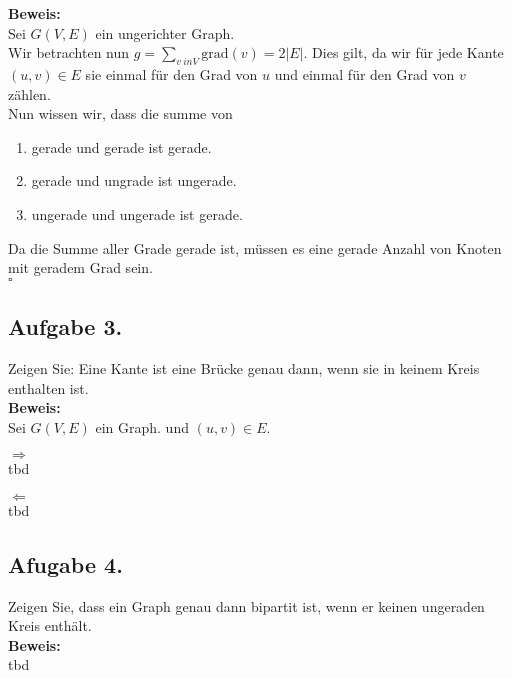\documentclass[11pt,a4paper,ngerman]{article}
\begin{document}
\textbf{Beweis:}\\

Sei $G(V,E)$ ein ungerichter Graph.\\

Wir betrachten nun $g = \underset{v\ in V}{\sum} \text{grad}(v) = 2 |E|$.
Dies gilt, da wir für jede Kante $(u,v) \in E$ sie einmal für den Grad von $u$ und einmal
für den Grad von $v$ zählen.\\

Nun wissen wir, dass die summe von
\begin{enumerate}
	\item gerade und gerade ist gerade.
	\item gerade und ungrade ist ungerade.
	\item ungerade und ungerade ist gerade.
\end{enumerate}
Da die Summe aller Grade gerade ist, müssen es eine gerade Anzahl von Knoten mit geradem Grad sein.\\

\mbox{}\hfill$\square$

\subsection*{Aufgabe 3.}

Zeigen Sie: Eine Kante ist eine Brücke genau dann, wenn sie in keinem Kreis enthalten ist.\\

\textbf{Beweis:}\\
Sei $G(V,E)$ ein Graph. und $(u,v) \in E$.

$\Rightarrow$\\
tbd

$\Leftarrow$\\

tbd

\subsection*{Afugabe 4.}

Zeigen Sie, dass ein Graph genau dann bipartit ist, wenn er keinen ungeraden Kreis enthält.\\

\textbf{Beweis:}\\

tbd

\label{LastPage}
\end{document}
